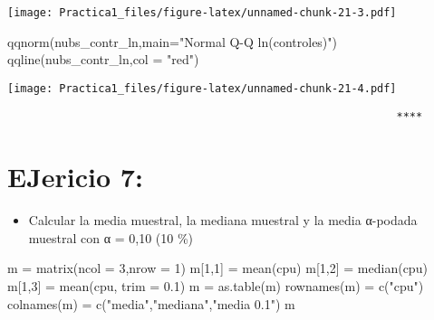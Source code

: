 \documentclass[
]{article}
\newenvironment{Shaded}{\begin{snugshade}}{\end{snugshade}}
\newcommand{\AttributeTok}[1]{\textcolor[rgb]{0.77,0.63,0.00}{#1}}
\newcommand{\ConstantTok}[1]{\textcolor[rgb]{0.00,0.00,0.00}{#1}}
\newcommand{\DecValTok}[1]{\textcolor[rgb]{0.00,0.00,0.81}{#1}}
\newcommand{\FloatTok}[1]{\textcolor[rgb]{0.00,0.00,0.81}{#1}}
\newcommand{\FunctionTok}[1]{\textcolor[rgb]{0.00,0.00,0.00}{#1}}
\newcommand{\NormalTok}[1]{#1}
\newcommand{\OtherTok}[1]{\textcolor[rgb]{0.56,0.35,0.01}{#1}}
\newcommand{\SpecialCharTok}[1]{\textcolor[rgb]{0.00,0.00,0.00}{#1}}
\newcommand{\StringTok}[1]{\textcolor[rgb]{0.31,0.60,0.02}{#1}}
\providecommand{\tightlist}{%
  \setlength{\itemsep}{0pt}\setlength{\parskip}{0pt}}
\begin{document}
\texttt{[image: Practica1\_files/figure-latex/unnamed-chunk-21-3.pdf]}

\begin{Shaded}
\begin{Highlighting}[]
\FunctionTok{qqnorm}\NormalTok{(nubs\_contr\_ln,}\AttributeTok{main=}\StringTok{"Normal Q{-}Q ln(controles)"}\NormalTok{)}
\FunctionTok{qqline}\NormalTok{(nubs\_contr\_ln,}\AttributeTok{col =} \StringTok{"red"}\NormalTok{)}
\end{Highlighting}
\end{Shaded}

\texttt{[image: Practica1\_files/figure-latex/unnamed-chunk-21-4.pdf]}

\begin{verbatim}
                                                            ****
\end{verbatim}

\hypertarget{ejericio-7}{%
\section{EJericio 7:}\label{ejericio-7}}

\begin{Shaded}
\end{Shaded}

\begin{itemize}
\tightlist
\item
  Calcular la media muestral, la mediana muestral y la media α-podada
  muestral con α = 0,10 (10 \%)
\end{itemize}

\begin{Shaded}
\begin{Highlighting}[]
\NormalTok{m }\OtherTok{=} \FunctionTok{matrix}\NormalTok{(}\AttributeTok{ncol =} \DecValTok{3}\NormalTok{,}\AttributeTok{nrow =} \DecValTok{1}\NormalTok{)}
\NormalTok{m[}\DecValTok{1}\NormalTok{,}\DecValTok{1}\NormalTok{] }\OtherTok{=} \FunctionTok{mean}\NormalTok{(cpu)}
\NormalTok{m[}\DecValTok{1}\NormalTok{,}\DecValTok{2}\NormalTok{] }\OtherTok{=} \FunctionTok{median}\NormalTok{(cpu)}
\NormalTok{m[}\DecValTok{1}\NormalTok{,}\DecValTok{3}\NormalTok{] }\OtherTok{=} \FunctionTok{mean}\NormalTok{(cpu, }\AttributeTok{trim =} \FloatTok{0.1}\NormalTok{)}
\NormalTok{m }\OtherTok{=} \FunctionTok{as.table}\NormalTok{(m)}
\FunctionTok{rownames}\NormalTok{(m) }\OtherTok{=} \FunctionTok{c}\NormalTok{(}\StringTok{"cpu"}\NormalTok{)}
\FunctionTok{colnames}\NormalTok{(m) }\OtherTok{=} \FunctionTok{c}\NormalTok{(}\StringTok{"media"}\NormalTok{,}\StringTok{"mediana"}\NormalTok{,}\StringTok{"media 0.1"}\NormalTok{)}
\NormalTok{m}
\end{Highlighting}
\end{Shaded}
\end{document}
